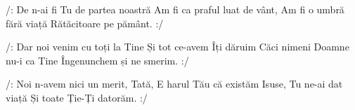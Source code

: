 
\beginverse
/: De n-ai fi Tu de partea noastră
Am fi ca praful luat de vânt,
Am fi o umbră fără viață
Rătăcitoare pe pământ. :/
\endverse

\beginchorus
/: Dar noi venim cu toți la Tine
Și tot ce-avem Îți dăruim
Căci nimeni Doamne nu-i ca Tine
Îngenunchem și ne smerim. :/
\endchorus

\beginverse
/: Noi n-avem nici un merit, Tată,
E harul Tău că existăm
Isuse, Tu ne-ai dat viață
Și toate Ție-Ți datorăm. :/
\endverse

\endsong